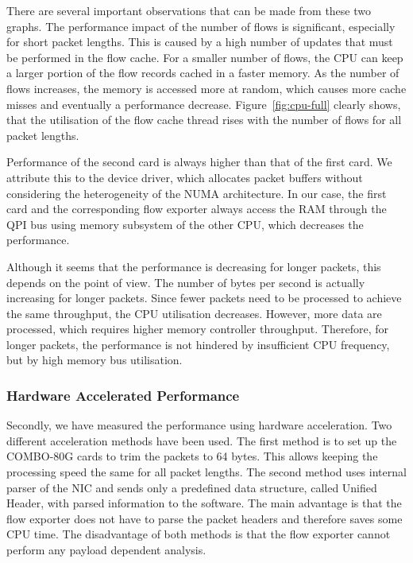 There are several important observations that can be made from these two graphs. The performance impact of the number of flows is significant, especially for short packet lengths. This is caused by a high number of updates that must be performed in the flow cache. For a smaller number of flows, the CPU can keep a larger portion of the flow records cached in a faster memory. As the number of flows increases, the memory is accessed more at random, which causes more cache misses and eventually a performance decrease. Figure~\ref{fig:cpu-full} clearly shows, that the utilisation of the flow cache thread rises with the number of flows for all packet lengths.

Performance of the second card is always higher than that of the first card. We attribute this to the device driver, which allocates packet buffers without considering the heterogeneity of the NUMA architecture. In our case, the first card and the corresponding flow exporter always access the RAM through the QPI bus using memory subsystem of the other CPU, which decreases the performance.

Although it seems that the performance is decreasing for longer packets, this depends on the point of view. The number of bytes per second is actually increasing for longer packets. Since fewer packets need to be processed to achieve the same throughput, the CPU utilisation decreases. However, more data are processed, which requires higher memory controller throughput. Therefore, for longer packets, the performance is not hindered by insufficient CPU frequency, but by high memory bus utilisation.


\subsubsection{Hardware Accelerated Performance}

Secondly, we have measured the performance using hardware acceleration. Two different acceleration methods have been used. The first method is to set up the COMBO-80G cards to trim the packets to 64 bytes. This allows keeping the processing speed the same for all packet lengths. The second method uses internal parser of the NIC and sends only a predefined data structure, called Unified Header, with parsed information to the software. The main advantage is that the flow exporter does not have to parse the packet headers and therefore saves some CPU time. The disadvantage of both methods is that the flow exporter cannot perform any payload dependent analysis.

